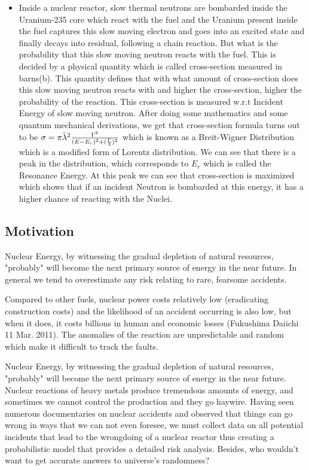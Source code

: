 \documentclass{article}
\begin{document}
\begin{itemize}
    \item Inside a nuclear reactor, slow thermal neutrons are bombarded inside the Uranium-235 core which react with the fuel and the Uranium present inside the fuel captures this slow moving electron and goes into an excited state and finally decays into residual, following a chain reaction. But what is the probability that this slow moving neutron reacts with the fuel. This is decided by a physical quantity which is called cross-section measured in barns(b). This quantity defines that with what amount of cross-section does this slow moving neutron reacts with and higher the cross-section, higher the probability of the reaction. This cross-section is measured w.r.t Incident Energy of slow moving neutron. After doing some mathematics and some quantum mechanical derivations, we get that cross-section formula turns out to be $\sigma = \pi \Bar{\lambda}^2 \frac{\Gamma^2}{(E - E_r)^2 + (\frac{\Gamma}{2})^2}$ which is known as a Breit-Wigner Distribution which is a modified form of Lorentz distribution. We can see that there is a peak in the distribution, which corresponds to $E_r$ which is called the Resonance Energy. At this peak we can see that cross-section is maximized which shows that if an incident Neutron is bombarded at this energy, it has a higher chance of reacting with the Nuclei.
\end{itemize}

\subsection{Motivation}
Nuclear Energy, by witnessing the gradual depletion of natural resources, "probably" will become the next primary source of energy in the near future.  In general we tend to overestimate any risk relating to rare, fearsome accidents.

Compared to other fuels, nuclear power costs relatively low (eradicating construction costs) and the likelihood of an accident occurring is also low, but when it does, it costs billions in human and economic losses (Fukushima Daiichi 11 Mar. 2011). The anomalies of the reaction are unpredictable and random which make it difficult to track the faults.

Nuclear Energy, by witnessing the gradual depletion of natural resources, "probably" will become the next primary source of energy in the near future. Nuclear reactions of heavy metals produce tremendous amounts of energy, and sometimes we cannot control the production and they go haywire. Having seen numerous documentaries on nuclear accidents and observed that things can go wrong in ways that we can not even foresee, we must collect data on all potential incidents that lead to the wrongdoing of a nuclear reactor thus creating a probabilistic model that provides a detailed risk analysis. Besides, who wouldn't want to get accurate answers to  universe's randomness?
\end{document}
